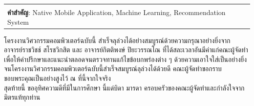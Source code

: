 \documentclass[14pt,oneside,openright,a4paper]{cpe-thai-project}
\begin{document}

\begin{flushleft}
\begin{tabular*}{\textwidth}{@{}lp{}}
 & \\

\textbf{คำสำคัญ}: Native Mobile Application, Machine Learning, Recommendation System
\end{tabular*}
\end{flushleft}
\endabstract


\preface
โครงงานวิศวกรรมคอมพิวเตอร์ฉบับนี้ สำเร็จลุล่วงได้อย่างสมบูรณ์ด้วยความกรุณาอย่างยิ่งจาก อาจารย์ราชวิชช์ สโรชวิกสิต และ 
อาจารย์กิตติพงษ์ ปิยะวรรณโณ ที่ได้สละเวลาอันมีค่าแก่คณะผู้จัดทำ เพื่อให้คำปรึกษาและแนะนำตลอดจนตรวจทานแก้ไขข้อบกพร่องต่าง ๆ ด้วยความเอาใจใส่เป็นอย่างยิ่ง 
จนโครงงานวิศวกรรมคอมพิวเตอร์ฉบับนี้สำเร็จสมบูรณ์ลุล่วงได้ด้วยดี คณะผู้จัดทำขอกราบขอบพระคุณเป็นอย่างสูงไว้ ณ ที่นี้จากใจจริง 
\\
สุดท้ายนี้ ขออุทิศความดีที่มีในการศึกษา นี้แด่บิดา มารดา ครอบครัวของคณะผู้จัดทำและกำลังใจจากมิตรแท้ทุกท่าน

\tableofcontents                    
\listoftables
\listoffigures                      
\end{document}
